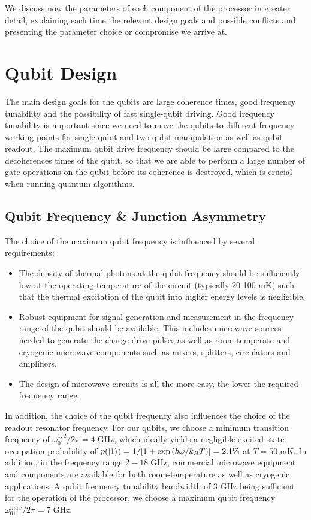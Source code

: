 \smallskip

We discuss now the parameters of each component of the processor in greater detail, explaining each time the relevant design goals and possible conflicts and presenting the parameter choice or compromise we arrive at.

\section{Qubit Design}

The main design goals for the qubits are large coherence times, good frequency tunability and the possibility of fast single-qubit driving. Good frequency tunability is important since we need to move the qubits to different frequency working points for single-qubit and two-qubit manipulation as well as qubit readout. The maximum qubit drive frequency should be large compared to the decoherences times of the qubit, so that we are able to perform a large number of gate operations on the qubit before its coherence is destroyed, which is crucial when running quantum algorithms.

\subsection{Qubit Frequency \& Junction Asymmetry}

The choice of the maximum qubit frequency is influenced by several requirements:

\begin{itemize}
\item The density of thermal photons at the qubit frequency should be sufficiently low at the operating temperature of the circuit (typically 20-100 mK) such that the thermal excitation of the qubit into higher energy levels is negligible.
\item Robust equipment for signal generation and measurement in the frequency range of the qubit should be available. This includes microwave sources needed to generate the charge drive pulses as well as room-temperate and cryogenic microwave components such as mixers, splitters, circulators and amplifiers.
\item The design of microwave circuits is all the more easy, the lower the required frequency range.
\end{itemize}

In addition, the choice of the qubit frequency also influences the choice of the readout resonator frequency. For our qubits, we choose a minimum transition frequency of $\omega_{01}^{1,2}/2\pi= 4 \;\mathrm{GHz}$, which ideally yields a negligible excited state occupation probability of $p(\left| 1 \right>)=1/[1+\exp{(\hbar \omega / k_B T)}]=2.1\%$ at $T=50\;\mathrm{mK}$. In addition, in the frequency range $2-18\;\mathrm{GHz}$, commercial microwave equipment and components are available for both room-temperature as well as cryogenic applications. A qubit frequency tunability bandwidth of 3 GHz being sufficient for the operation of the processor, we choose a maximum qubit frequency $\omega_{01}^{max}/2\pi = 7\;\mathrm{GHz}$.

